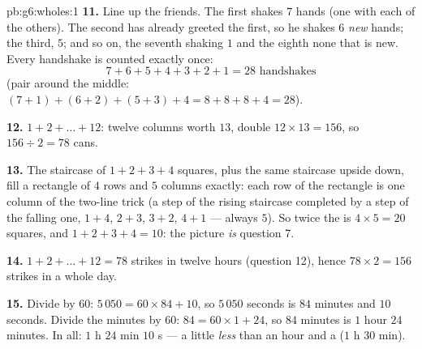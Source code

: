 \begin{solution}{pb:g6:wholes:1}
\textbf{11.} Line up the friends. The first shakes $7$ hands (one
with each of the others). The second has already greeted the
first, so he shakes $6$ \emph{new} hands; the third, $5$; and so
on, the seventh shaking $1$ and the eighth none that is new.
Every handshake is counted exactly once:
\[
7 + 6 + 5 + 4 + 3 + 2 + 1 = 28 \text{ handshakes}
\]
(pair around the middle: $(7+1) + (6+2) + (5+3) + 4 =
8 + 8 + 8 + 4 = 28$).

\textbf{12.} $1 + 2 + \dots + 12$: twelve columns worth $13$,
double  $12 \times 13 = 156$, so
$156 \div 2 = 78$ cans.

\textbf{13.} The staircase of $1 + 2 + 3 + 4$ squares, plus the
same staircase upside down, fill a rectangle of $4$ rows and $5$
columns exactly: each row of the rectangle is one column of the
two-line trick (a step of the rising staircase completed by a
step of the falling one, $1 + 4$, $2 + 3$, $3 + 2$, $4 + 1$ ---
always $5$). So twice the  is $4 \times 5 = 20$ squares, and
$1 + 2 + 3 + 4 = 10$: the picture \emph{is} question 7.

\textbf{14.} $1 + 2 + \dots + 12 = 78$ strikes in twelve hours
(question 12), hence $78 \times 2 = 156$ strikes in a whole day.

\textbf{15.} Divide by $60$: $5\,050 = 60 \times 84 + 10$, so
$5\,050$ seconds is $84$ minutes and $10$ seconds. Divide the
minutes by $60$: $84 = 60 \times 1 + 24$, so $84$ minutes is
$1$ hour $24$ minutes. In all: $1$ h $24$ min $10$ s --- a little
\emph{less} than an hour and a  ($1$ h $30$ min).
\end{solution}
